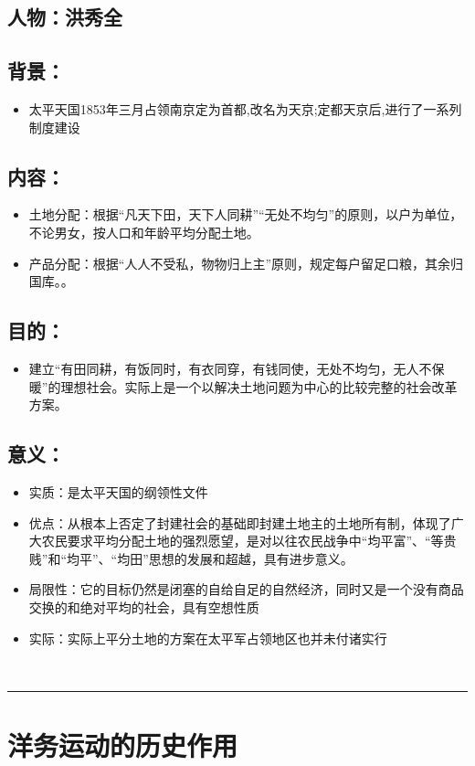 \documentclass{article}
\begin{document}
\subsection*{人物：洪秀全}
\subsection*{背景：}
\begin{itemize}
	\item 太平天国1853年三月占领南京定为首都,改名为天京;定都天京后,进行了一系列制度建设
\end{itemize}
\subsection*{内容：}
\begin{itemize}
    \item 土地分配：根据“凡天下田，天下人同耕”“无处不均匀”的原则，以户为单位，不论男女，按人口和年龄平均分配土地。
    \item  产品分配：根据“人人不受私，物物归上主”原则，规定每户留足口粮，其余归国库。。
\end{itemize}
\subsection*{目的：}
\begin{itemize}
	\item 建立“有田同耕，有饭同时，有衣同穿，有钱同使，无处不均匀，无人不保暖”的理想社会。实际上是一个以解决土地问题为中心的比较完整的社会改革方案。
\end{itemize}
\subsection*{意义：}
\begin{itemize}
	\item 实质：是太平天国的纲领性文件
    \item  优点：从根本上否定了封建社会的基础即封建土地主的土地所有制，体现了广大农民要求平均分配土地的强烈愿望，是对以往农民战争中“均平富”、“等贵贱”和“均平”、“均田”思想的发展和超越，具有进步意义。
    \item 局限性：它的目标仍然是闭塞的自给自足的自然经济，同时又是一个没有商品交换的和绝对平均的社会，具有空想性质
    \item 实际：实际上平分土地的方案在太平军占领地区也并未付诸实行
\end{itemize}
\ \hrule

\section*{洋务运动的历史作用}
\end{document}
